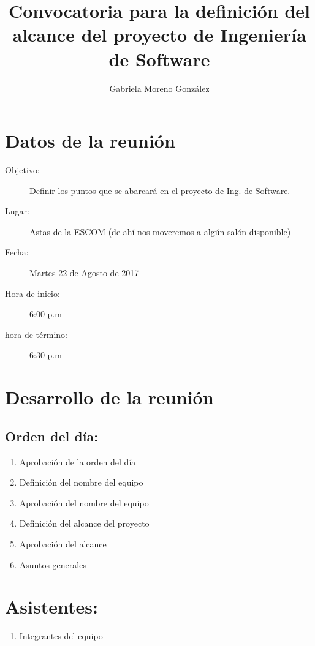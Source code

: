 \documentclass[12pt]{article}
\title{Convocatoria para la definición del alcance del proyecto de Ingeniería de Software}
\author{Gabriela Moreno González}
\begin{document}
\maketitle
\tableofcontents

\section{Datos de la reunión}
\begin{description}
	\item[Objetivo:] Definir los puntos que se abarcará en el proyecto de Ing. de Software.
	\item[Lugar:] Astas de la ESCOM (de ahí nos moveremos a algún salón disponible)
	\item[Fecha:] Martes 22 de Agosto de 2017
	\item[Hora de inicio:] 6:00 p.m
	\item[hora de término:] 6:30 p.m
\end{description}

\section{Desarrollo de la reunión}

\subsection{Orden del día:}
\begin{enumerate}
 	\item Aprobación de la orden del día
	\item Definición del nombre del equipo
	\item Aprobación del nombre del equipo
	\item Definición del alcance del proyecto
	\item Aprobación del alcance
	\item Asuntos generales
\end{enumerate}

\section{Asistentes:}
\begin{enumerate}
 	 \item  Integrantes del equipo
\end{enumerate}
\end{document}
